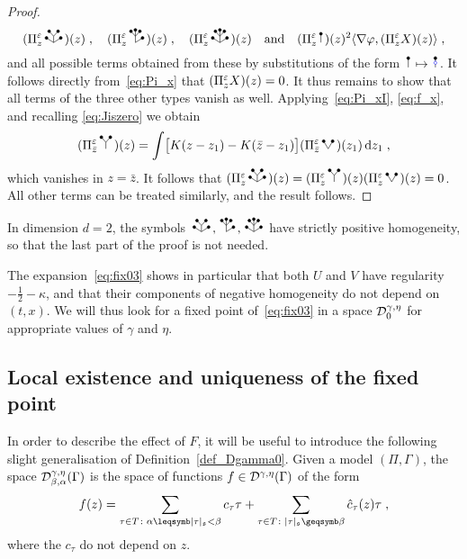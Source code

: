 \documentclass[reqno,11pt]{article}
\def\abss#1{\abs{#1}_\mathfrak{s}}
\begin{document}
\begin{proof}
\[
 (\Pi^\eps_z \RSWV)(z)\;, \quad
 (\Pi^\eps_z \RSVW)(z)\;, \quad
 (\Pi^\eps_z \RSWW)(z) \quad
 \text{and} \quad 
 (\Pi^\eps_z \RSI)(z)^2 \pscal{\nabla\varphi}{(\Pi^\eps_z X)(z)}\;,
\]
and all possible terms obtained from these by substitutions of the form
$\RSI\mapsto\RSoI$. It follows directly from~\eqref{eq:Pi_x} that 
$(\Pi^\varepsilon_z X)(z) = 0$. It thus remains to show that all terms of the three
other types vanish as well. Applying~\eqref{eq:Pi_xI}, \eqref{eq:f_x}, and 
recalling \eqref{eq:Jiszero} we obtain 
\[
(\Pi^\eps_{\bar z} \RSY)(z) = 
\int \bigbrak{K(z-z_1)-K(\bar z-z_1)}(\Pi^\eps_{\bar z} \RSV)(z_1)\6z_1\;, 
\]
which vanishes in $z=\bar z$. It follows that 
$(\Pi^\eps_z \RSWV)(z) = (\Pi^\eps_z \RSY)(z)(\Pi^\eps_z \RSV)(z) = 0$. 
All other terms can be treated similarly, and the result follows. 
\end{proof}

\begin{remark}
\label{rem:d=2}
In dimension $d=2$, the symbols $\RSWV, \RSVW, \RSWW$ have strictly positive
homogeneity, so that the last part of the proof is not needed. 
\end{remark}

The expansion~\eqref{eq:fix03} shows in particular that both $U$ and $V$ have
regularity $-\frac12-\kappa$, and that their components of negative homogeneity
do not depend on $(t,x)$. We will thus look for a fixed point
of~\eqref{eq:fix03} in a space ${\mathcal D}^{\gamma,\eta}_0$ for appropriate values of
$\gamma$ and $\eta$. 



\subsection{Local existence and uniqueness of the fixed point}
\label{ssec_fix_exist}

In order to describe the effect of $F$, it will be useful to introduce the
following slight generalisation of Definition~\ref{def_Dgamma0}. Given a model
$(\Pi,\Gamma)$, the space ${\mathcal D}^{\gamma,\eta}_{\beta,\alpha}(\Gamma)$ is the
space of functions $f \in {\mathcal D}^{\gamma,\eta}(\Gamma)$ of the form 
\begin{equation}
 \label{eq:fex01}
 f(z) = \sum_{\tau\in T\colon \alpha \leqs \abss{\tau} < \beta} c_\tau \tau +
\sum_{\tau\in T\colon\abss{\tau}\geqs\beta} \hat c_\tau(z)\tau \;,
\end{equation}
where the $c_\tau$ do not depend on $z$. 
\end{document}
